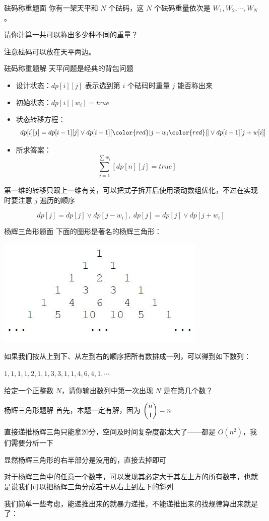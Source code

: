 \documentclass{pptt}
\begin{document}
\begin{frame}{砝码称重}{题面}
    你有一架天平和 $N$ 个砝码，这 $N$ 个砝码重量依次是 $W_1,W_2,\cdots,W_N$。

    请你计算一共可以称出多少种不同的重量？

    注意砝码可以放在天平两边。
\end{frame}

\begin{frame}{砝码称重}{题解}
    天平问题是经典的背包问题

    \begin{itemize}
        \item 设计状态：$dp[i][j]$ 表示选到第 $i$ 个砝码时重量 $j$ 能否称出来
        \item 初始状态：$dp[i][w_i]=true$
        \item 状态转移方程：$$dp[i][j]=dp[i-1][j] \lor dp[i-1][{\color{red}|}j-w_i{\color{red}|}] \lor dp[i-1][j+w[i]]$$
        \item 所求答案：$$\sum_{j=1}^{\sum w_i}[dp[n][j]=true]$$
    \end{itemize}

    第一维的转移只跟上一维有关，可以把式子拆开后使用滚动数组优化，不过在实现时要注意 $j$ 遍历的顺序

    $$dp[j]=dp[j] \lor dp[j-w_i],~dp[j]=dp[j] \lor dp[j+w_i]$$
\end{frame}

\begin{frame}{杨辉三角形}{题面}
    下面的图形是著名的杨辉三角形：

    \includegraphics[scale=0.5]{images/yh.jpg}

    如果我们按从上到下、从左到右的顺序把所有数排成一列，可以得到如下数列：

    $1, 1, 1, 1, 2, 1, 1, 3, 3, 1, 1, 4, 6, 4, 1, \cdots$

    给定一个正整数 $N$，请你输出数列中第一次出现 $N$ 是在第几个数？
\end{frame}

\begin{frame}{杨辉三角形}{题解}
    首先，本题一定有解，因为 $\dbinom{n}{1}=n$

    直接递推杨辉三角只能拿20分，空间及时间复杂度都太大了——都是 $O(n^2)$，我们需要分析一下

    显然杨辉三角形的右半部分是没用的，直接去掉即可

    对于杨辉三角中的任意一个数字，可以发现其必定大于其左上方的所有数字，也就是说我们可以把杨辉三角分成若干从右上到左下的斜列

    我们简单一些考虑，能递推出来的就暴力递推，不能递推出来的找规律算出来就是了：

\end{frame}
\end{document}
